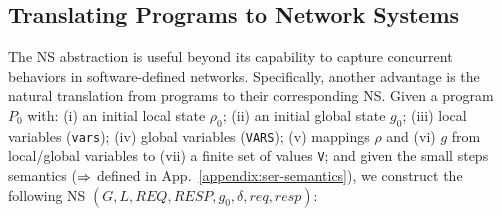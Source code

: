 %
%
%
%
%
%

\subsection{Translating \toolname{} Programs to Network Systems}
\label{subsec:SerToNsTranslation}
%
The NS abstraction is useful beyond its capability to capture concurrent behaviors in software-defined networks.
%
Specifically, another advantage is the natural translation from  \toolname{} programs to their corresponding NS.
%
%
Given a \toolname{} program \(P_0\) with: (i) an initial local state \(\rho_0\); (ii) an initial global state \(g_0\); (iii) local variables (\texttt{vars}); (iv) global variables (\texttt{VARS}); (v) mappings \(\rho\) and (vi) \(g\) from local/global variables to (vii) a finite set of values \texttt{V}; and given the small steps semantics ($\mathrel{\Rightarrow}$ defined in App.~\ref{appendix:ser-semantics}), we construct the following NS $(G, L, \mathit{REQ},  \mathit{RESP}, g_0, \delta, \mathit{req}, \mathit{resp})$:

